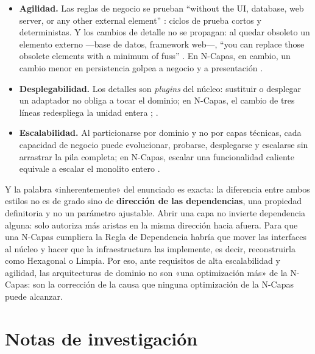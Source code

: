 \begin{itemize}
  \item \textbf{Agilidad.} Las reglas de negocio se prueban “without the UI, database, web
        server, or any other external element” \parencite[202]{martin2017}: ciclos de prueba
        cortos y deterministas. Y los cambios de detalle no se propagan: al quedar obsoleto un
        elemento externo —base de datos, framework web—, “you can replace those obsolete
        elements with a minimum of fuss” \parencite[209]{martin2017}. En N-Capas, en cambio, un
        cambio menor en persistencia golpea a negocio y a presentación
        \parencite[4]{richards2015}.
  \item \textbf{Desplegabilidad.} Los detalles son \emph{plugins} del núcleo: sustituir o
        desplegar un adaptador no obliga a tocar el dominio; en N-Capas, el cambio de tres
        líneas redespliega la unidad entera \parencite[cap.~10]{richardsford2020};
        \parencite[8]{richards2015}.
  \item \textbf{Escalabilidad.} Al particionarse por dominio y no por capas técnicas, cada
        capacidad de negocio puede evolucionar, probarse, desplegarse y escalarse sin arrastrar
        la pila completa; en N-Capas, escalar una funcionalidad caliente equivale a escalar el
        monolito entero \parencite[9]{richards2015}.
\end{itemize}

Y la palabra «inherentemente» del enunciado es exacta: la diferencia entre ambos estilos no es
de grado sino de \textbf{dirección de las dependencias}, una propiedad definitoria y no un
parámetro ajustable. Abrir una capa no invierte dependencia alguna: solo autoriza más aristas en
la misma dirección hacia afuera. Para que una N-Capas cumpliera la Regla de Dependencia habría
que mover las interfaces al núcleo y hacer que la infraestructura las implemente, es decir,
reconstruirla como Hexagonal o Limpia. Por eso, ante requisitos de alta escalabilidad y
agilidad, las arquitecturas de dominio no son «una optimización más» de la N-Capas: son la
corrección de la causa que ninguna optimización de la N-Capas puede alcanzar.





\section*{Notas de investigación}


\endgroup
